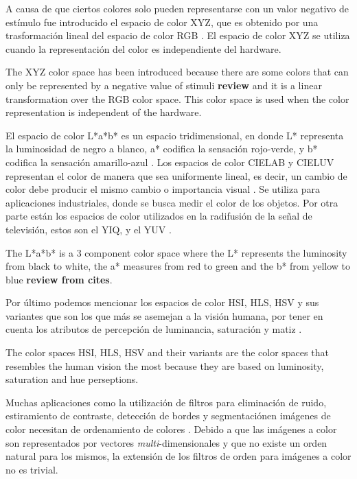 A causa de que ciertos colores solo pueden representarse con un valor negativo de est\'imulo fue introducido el espacio de color XYZ, que es obtenido por una trasformaci\'on lineal del espacio de color RGB \cite{ortiz2002procesamiento}. El espacio de color XYZ se utiliza cuando la representaci\'on del color es independiente del hardware.

The XYZ color space has been introduced because there are some colors that can only be represented by a negative value of stimuli \textbf{review} and it is a linear transformation over the RGB color space\cite{ortiz2002procesamiento}. This color space is used when the color representation is independent of the hardware.

El espacio de color L*a*b* es un espacio tridimensional, en donde L* representa la luminosidad de negro a blanco, a* codifica la sensaci\'on rojo-verde, y b* codifica la sensaci\'on amarillo-azul \cite{leon2006color}. 
Los espacios de color CIELAB y CIELUV representan el color de manera que sea uniformente lineal, es decir, un cambio de color debe producir el mismo cambio o importancia visual \cite{mahy1994evaluation}. Se utiliza para aplicaciones industriales, donde se busca medir el color de los objetos.  Por otra parte est\'an los espacios de color utilizados en la radifusi\'on de la se\~nal de televisi\'on, estos son el YIQ, y el YUV \cite{munson1995color}.

The L*a*b* is a 3 component color space where the L* represents the luminosity from black to white, the a* measures from red to green and the b* from yellow to blue\cite{leon2006color} \textbf{review from cites}.

Por \'ultimo podemos mencionar los espacios de color HSI, HLS, HSV y sus variantes que son los que m\'as se asemejan a la visi\'on humana, por tener en cuenta los atributos de percepci\'on de luminancia, saturaci\'on y matiz \cite{zamora2001comparative}.

The color spaces HSI, HLS, HSV and their variants are the color spaces that resembles the human vision the most because they are based on luminosity, saturation and hue perseptions\cite{zamora2001comparativos}.

Muchas aplicaciones como la utilización de filtros para eliminaci\'on de ruido, estiramiento de contraste, detecci\'on de bordes y segmentaci\'onen imágenes de color necesitan de ordenamiento de colores  \cite{ortiz2002procesamiento}.  Debido a que las im\'agenes a color son representados por vectores \textit{multi}-dimensionales y que no existe un orden natural para los mismos, la extensi\'on de los filtros de orden para im\'agenes a color no es trivial.

